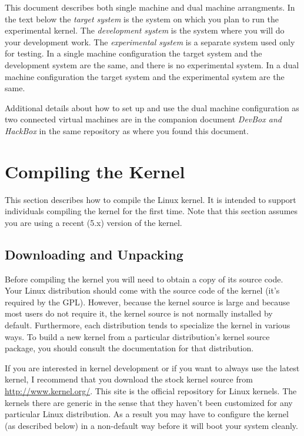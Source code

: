 \documentclass{article}
\newcommand{\newterm}[1]{\textit{#1}}
\begin{document}
This document describes both single machine and dual machine arrangments. In the text below the
\newterm{target system} is the system on which you plan to run the experimental kernel. The
\newterm{development system} is the system where you will do your development work. The
\newterm{experimental system} is a separate system used only for testing. In a single machine
configuration the target system and the development system are the same, and there is no
experimental system. In a dual machine configuration the target system and the experimental
system are the same.

Additional details about how to set up and use the dual machine configuration as two connected
virtual machines are in the companion document \textit{DevBox and HackBox} in the same
repository as where you found this document.

\section{Compiling the Kernel}

This section describes how to compile the Linux kernel. It is intended to support individuals
compiling the kernel for the first time. Note that this section assumes you are using a recent
(5.x) version of the kernel.

\subsection{Downloading and Unpacking}

Before compiling the kernel you will need to obtain a copy of its source code. Your Linux
distribution should come with the source code of the kernel (it's required by the GPL). However,
because the kernel source is large and because most users do not require it, the kernel source
is not normally installed by default. Furthermore, each distribution tends to specialize the
kernel in various ways. To build a new kernel from a particular distribution's kernel source
package, you should consult the documentation for that distribution.

If you are interested in kernel development or if you want to always use the latest kernel, I
recommend that you download the stock kernel source from \url{http://www.kernel.org/}. This site
is the official repository for Linux kernels. The kernels there are generic in the sense that
they haven't been customized for any particular Linux distribution. As a result you may have to
configure the kernel (as described below) in a non-default way before it will boot your system
cleanly.
\end{document}
